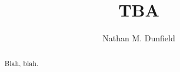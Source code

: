 \documentclass{nmd}
\title{TBA}
\author{Nathan M. Dunfield}
\begin{document}
\begin{abstract} 
  Blah, blah.  
\end{abstract}
\maketitle


{\RaggedRight 
 

}
\end{document}
